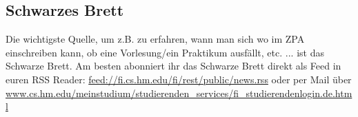 \subsection{Schwarzes Brett}
Die wichtigste Quelle, um z.B. zu erfahren, wann man sich wo im ZPA 
einschreiben kann, ob eine Vorlesung/ein Praktikum ausfällt, etc. ... ist 
das Schwarze Brett.\doublebreak
Am besten abonniert ihr das Schwarze Brett direkt als Feed in euren 
RSS Reader:  \url{feed://fi.cs.hm.edu/fi/rest/public/news.rss} oder 
per Mail über \url{www.cs.hm.edu/meinstudium/studierenden\_services/fi\_studierendenlogin.de.html} 